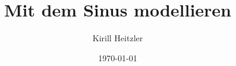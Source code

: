 \documentclass[11pt]{beamer}
\title{Mit dem Sinus modellieren}
\author{Kirill Heitzler}
\date{\today}
\begin{document}
\begin{frame}
    \titlepage
\end{frame}

\begin{frame}
    \tableofcontents
\end{frame}


%
%
%
%
%
\end{document}
